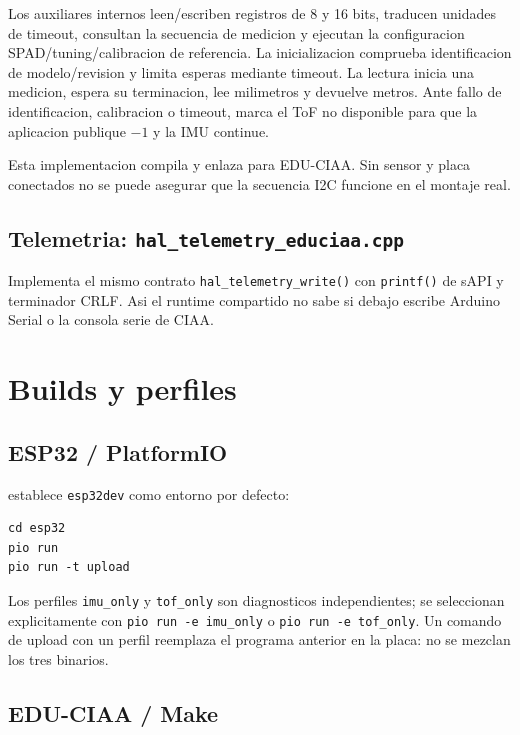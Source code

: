 \documentclass[11pt,a4paper]{article}
\newcommand{\ruta}[1]{\path{#1}}
\begin{document}
Los auxiliares internos leen/escriben registros de 8 y 16 bits, traducen
unidades de timeout, consultan la secuencia de medicion y ejecutan la
configuracion SPAD/tuning/calibracion de referencia. La inicializacion comprueba
identificacion de modelo/revision y limita esperas mediante timeout. La lectura
inicia una medicion, espera su terminacion, lee milimetros y devuelve metros.
Ante fallo de identificacion, calibracion o timeout, marca el ToF no disponible
para que la aplicacion publique $-1$ y la IMU continue.

Esta implementacion compila y enlaza para EDU-CIAA. Sin sensor y placa conectados
no se puede asegurar que la secuencia I2C funcione en el montaje real.

\subsection{Telemetria: \texttt{hal\_telemetry\_educiaa.cpp}}

Implementa el mismo contrato \texttt{hal\_telemetry\_write()} con
\texttt{printf()} de sAPI y terminador CRLF. Asi el runtime compartido no sabe
si debajo escribe Arduino Serial o la consola serie de CIAA.

\section{Builds y perfiles}

\subsection{ESP32 / PlatformIO}

\ruta{esp32/platformio.ini} establece \texttt{esp32dev} como entorno por
defecto:

\begin{lstlisting}
cd esp32
pio run
pio run -t upload
\end{lstlisting}

Los perfiles \texttt{imu\_only} y \texttt{tof\_only} son diagnosticos
independientes; se seleccionan explicitamente con
\texttt{pio run -e imu\_only} o \texttt{pio run -e tof\_only}. Un comando de
upload con un perfil reemplaza el programa anterior en la placa: no se mezclan
los tres binarios.

\subsection{EDU-CIAA / Make}
\end{document}
